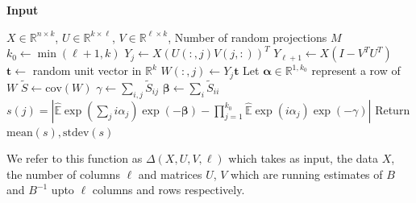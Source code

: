 \documentclass[letterpaper]{article}
\newcommand{\balpha}{\pmb{\alpha}}
\newcommand{\bt}{\pmb{t}}
\newcommand{\bbeta}{\pmb{\beta}}
\newcommand{\E}{\mathbb{E}}
\newcommand{\cov}{\text{cov}}
\newcommand\bindent{%
  \begingroup
  \setlength{\itemindent}{\myindent}
  \addtolength{\algorithmicindent}{\myindent}
}
\newcommand\eindent{\endgroup}
\newlength\myindent
\newcommand{\bb}[1]{\left(#1\right)}
\newcommand{\bbb}[1]{\left[#1\right]}
\DeclareMathOperator*{\argmin}{arg\,min}
\begin{document}
\begin{algorithm}[!hbt]
\caption{\label{alg:independence_column_wise}Independence Score after extracting $\ell$ columns. $U$ and $V$ are running estimates of $B$ and $B^{-1}$ upto $\ell$ columns and rows respectively.} \label{alg:oja}
\begin{algorithmic}
\STATE \textbf{Input}
\bindent 
\STATE $X\in \mathbb{R}^{n\times k}$, $U\in\mathbb{R}^{k\times \ell}$, $V\in\mathbb{R}^{\ell\times k}$, Number of random projections $M$
\eindent
\STATE $k_0\leftarrow \min(\ell+1,k)$
 \STATE $Y_j \leftarrow X\bb{U(:,j)V(j,:)}^T$
 \ENDFOR
{}
\STATE $Y_{\ell+1}\leftarrow X\bb{I-V^TU^T}$
\ENDIF
{}
\STATE $\bt \leftarrow$ random unit vector in $\mathbb{R}^k$
\STATE $W(:,j)\leftarrow Y_j \bt$
\ENDFOR
\STATE Let $\balpha\in \mathbb{R}^{1,k_0}$ represent a row of $W$
\STATE $\tilde{S} \leftarrow \cov(W)$
\STATE $\gamma\leftarrow \sum_{i,j}\tilde{S}_{ij}$
\STATE $\bbeta\leftarrow \sum_{i}\tilde{S}_{ii}$
\STATE $s(j) = |\hat{\E}\exp(\sum_j i\alpha_j)\exp(-\bbeta)-\prod_{j=1}^{k_0}\hat{\E}\exp(i\alpha_j)\exp(-\gamma)|$
\ENDFOR
\STATE Return $\text{mean}(s),\text{stdev}(s)$
\end{algorithmic}
\end{algorithm}
We refer to this function as $\Delta\bb{X,U,V,\ell}$ which takes as input, the data $X$, the number of columns $\ell$ and matrices $U$, $V$ which are running estimates of $B$ and $B^{-1}$ upto $\ell$ columns and rows respectively.

\end{document}
